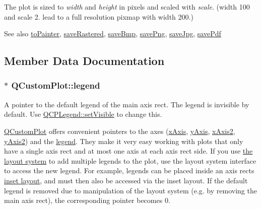 The plot is sized to {\itshape width} and {\itshape height} in pixels and scaled with {\itshape scale}. (width 100 and scale 2. lead to a full resolution pixmap with width 200.)

\begin{DoxySeeAlso}{See also}
\hyperlink{class_q_custom_plot_a1be68d5c0f1e086d6374d1340a193fb9}{to\+Painter}, \hyperlink{class_q_custom_plot_ad7723ce2edfa270632ef42b03a444352}{save\+Rastered}, \hyperlink{class_q_custom_plot_ae3a86ed0795670e50afa21759d4fa13d}{save\+Bmp}, \hyperlink{class_q_custom_plot_ac92cc9256d12f354b40a4be4600b5fb9}{save\+Png}, \hyperlink{class_q_custom_plot_a76f0d278e630a711fa6f48048cfd83e4}{save\+Jpg}, \hyperlink{class_q_custom_plot_ad5acd34f6b39c3516887d7e54fec2412}{save\+Pdf} 
\end{DoxySeeAlso}


\subsection{Member Data Documentation}
\subsubsection[{\texorpdfstring{legend}{legend}}]{ $\ast$ Q\+Custom\+Plot\+::legend}\hypertarget{class_q_custom_plot_a4eadcd237dc6a09938b68b16877fa6af}{}\label{class_q_custom_plot_a4eadcd237dc6a09938b68b16877fa6af}
A pointer to the default legend of the main axis rect. The legend is invisible by default. Use \hyperlink{class_q_c_p_layerable_a3bed99ddc396b48ce3ebfdc0418744f8}{Q\+C\+P\+Legend\+::set\+Visible} to change this.

\hyperlink{class_q_custom_plot}{Q\+Custom\+Plot} offers convenient pointers to the axes (\hyperlink{class_q_custom_plot_a9a79cd0158a4c7f30cbc702f0fd800e4}{x\+Axis}, \hyperlink{class_q_custom_plot_af6fea5679725b152c14facd920b19367}{y\+Axis}, \hyperlink{class_q_custom_plot_ada41599f22cad901c030f3dcbdd82fd9}{x\+Axis2}, \hyperlink{class_q_custom_plot_af13fdc5bce7d0fabd640f13ba805c0b7}{y\+Axis2}) and the \hyperlink{class_q_custom_plot_a4eadcd237dc6a09938b68b16877fa6af}{legend}. They make it very easy working with plots that only have a single axis rect and at most one axis at each axis rect side. If you use \hyperlink{}{the layout system} to add multiple legends to the plot, use the layout system interface to access the new legend. For example, legends can be placed inside an axis rect\textquotesingle{}s \hyperlink{class_q_c_p_axis_rect_a4114887c7141b59650b7488f930993e5}{inset layout}, and must then also be accessed via the inset layout. If the default legend is removed due to manipulation of the layout system (e.\+g. by removing the main axis rect), the corresponding pointer becomes 0.

